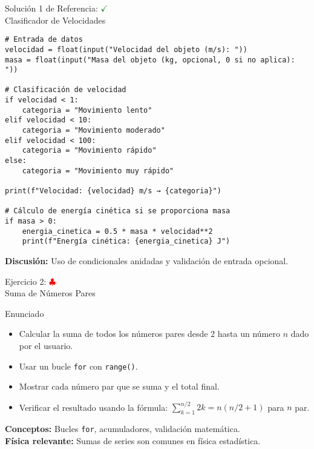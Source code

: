 \documentclass[10pt]{beamer}
\begin{document}
\begin{frame}[fragile]{Solución 1 de Referencia: \hfill \textcolor{green}{$\checkmark$} \\ Clasificador de Velocidades}
\begin{verbatim}
# Entrada de datos
velocidad = float(input("Velocidad del objeto (m/s): "))
masa = float(input("Masa del objeto (kg, opcional, 0 si no aplica): "))

# Clasificación de velocidad
if velocidad < 1:
    categoria = "Movimiento lento"
elif velocidad < 10:
    categoria = "Movimiento moderado"
elif velocidad < 100:
    categoria = "Movimiento rápido"
else:
    categoria = "Movimiento muy rápido"

print(f"Velocidad: {velocidad} m/s → {categoria}")

# Cálculo de energía cinética si se proporciona masa
if masa > 0:
    energia_cinetica = 0.5 * masa * velocidad**2
    print(f"Energía cinética: {energia_cinetica} J")
\end{verbatim}
\textbf{Discusión:} Uso de condicionales anidadas y validación de entrada opcional.
\end{frame}

\begin{frame}{Ejercicio 2: \hfill \textcolor{red}{$\clubsuit$} \\ Suma de Números Pares}
  \begin{block}{Enunciado}
    \begin{itemize}
      \item Calcular la suma de todos los números pares desde 2 hasta un número \(n\) dado por el usuario.
      \item Usar un bucle \texttt{for} con \texttt{range()}.
      \item Mostrar cada número par que se suma y el total final.
      \item Verificar el resultado usando la fórmula: $\sum_{k=1}^{n/2} 2k = n(n/2 + 1)$ para \(n\) par.
    \end{itemize}
  \end{block}
  
  \textbf{Conceptos:} Bucles \texttt{for}, acumuladores, validación matemática.
  \\
  \textbf{Física relevante:} Sumas de series son comunes en física estadística.
\end{frame}
\end{document}
